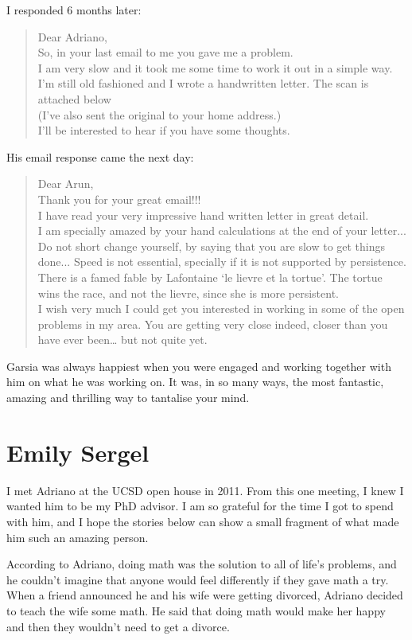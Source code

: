 \documentclass{notices}
\begin{document}
I responded 6 months later:
\begin{quote}
Dear Adriano,\\
So, in your last email to me you gave me a problem.\\
I am very slow and it took me some time to work it out in a simple way.
I'm still old fashioned and I wrote a handwritten letter.
The scan is attached below\\
(I've also sent the original to your home address.)\\

I'll be interested to hear if you have some thoughts.
\end{quote}

His email response came the next day:
\begin{quote}
Dear Arun,\\
Thank you for your great email!!!\\
I have read your very impressive hand written letter in great detail.\\
I am specially amazed by your hand calculations at the end of your letter...\\
Do not short change yourself, by saying that you are slow to get things done...
Speed is not essential, specially if it is not supported by persistence.
There is a famed fable by Lafontaine `le lievre et la tortue'.
The tortue wins the race, and not the lievre, since she is more persistent.\\
I wish very much I could get you interested in working in some of the open problems in my area.
You are getting very close indeed,
closer than you have ever been…
but not quite yet.
\end{quote}

Garsia was always happiest when you were engaged and working together with him on what he was working on.
It was, in so many ways, the most fantastic, amazing and thrilling way to tantalise your mind.

\section*{Emily Sergel}
I met Adriano at the UCSD open house in 2011. From this one meeting, I knew I wanted him to be my PhD advisor. I am so grateful for the time I got to spend with him, and I hope the stories below can show a small fragment of what made him such an amazing person.

According to Adriano, doing math was the solution to all of life's problems, and he couldn't imagine that anyone would feel differently if they gave math a try. When a friend announced he and his wife were getting divorced, Adriano decided to teach the wife some math. He said that doing math would make her happy and then they wouldn't need to get a divorce.
\end{document}
